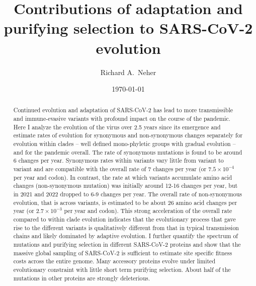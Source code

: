 \documentclass[aps,rmp, twocolumn]{revtex4}
\begin{document}
\title{Contributions of adaptation and purifying selection to SARS-CoV-2 evolution}
\author{Richard A.~Neher}
\address{Biozentrum, University of Basel, Basel, Switzerland }
\address{Swiss Institute of Bioinformatics, Switzerland }

\date{\today}

\begin{abstract}
Continued evolution and adaptation of SARS-CoV-2 has lead to more transmissible and immune-evasive variants with profound impact on the course of the pandemic.
Here I analyze the evolution of the virus over 2.5 years since its emergence and estimate rates of evolution for synonymous and non-synonymous changes separately for evolution within clades -- well defined mono-phyletic groups with gradual evolution -- and for the pandemic overall.
The rate of synonymous mutations is found to be around 6 changes per year.
Synonymous rates within variants vary little from variant to variant and are compatible with the overall rate of 7 changes per year (or $7.5\times 10^{-4}$ per year and codon).
In contrast, the rate at which variants accumulate amino acid changes (non-synonymous mutation) was initially around 12-16 changes per year, but in 2021 and 2022 dropped to 6-9 changes per year.
The overall rate of non-synonymous evolution, that is across variants, is estimated to be about 26 amino acid changes per year (or $2.7\times 10^{-3}$ per year and codon).
This strong acceleration of the overall rate compared to within clade evolution indicates that the evolutionary process that gave rise to the different variants is qualitatively different from that in typical transmission chains and likely dominated by adaptive evolution.
I further quantify the spectrum of mutations and purifying selection in different SARS-CoV-2 proteins and show that the massive global sampling of SARS-CoV-2 is sufficient to estimate site specific fitness costs across the entire genome.
Many accessory proteins evolve under limited evolutionary constraint with little short term purifying selection.
About half of the mutations in other proteins are strongly deleterious.
\end{abstract}

\maketitle
\end{document}

